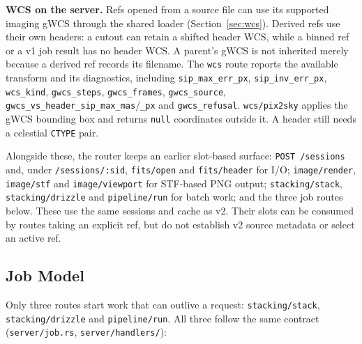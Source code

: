 \documentclass[11pt,a4paper]{article}
\newcommand{\code}[1]{\texttt{\small #1}}
\begin{document}
    \textbf{WCS on the server.} Refs opened from a source file can use its supported imaging gWCS through the shared loader (Section~\ref{sec:wcs}). Derived refs use their own headers: a cutout can retain a shifted header WCS, while a binned ref or a v1 job result has no header WCS. A parent's gWCS is not inherited merely because a derived ref records its filename. The \code{wcs} route reports the available transform and its diagnostics, including \code{sip\_max\_err\_px}, \code{sip\_inv\_err\_px}, \code{wcs\_kind}, \code{gwcs\_steps}, \code{gwcs\_frames}, \code{gwcs\_source}, \code{gwcs\_vs\_header\_sip\_max\_mas}/\code{\_px} and \code{gwcs\_refusal}. \code{wcs/pix2sky} applies the gWCS bounding box and returns \code{null} coordinates outside it. A header still needs a celestial \code{CTYPE} pair.

    Alongside these, the router keeps an earlier slot-based surface: \code{POST /sessions} and, under \code{/sessions/:sid}, \code{fits/open} and \code{fits/header} for I/O; \code{image/render}, \code{image/stf} and \code{image/viewport} for STF-based PNG output; \code{stacking/stack}, \code{stacking/drizzle} and \code{pipeline/run} for batch work; and the three job routes below. These use the same sessions and cache as v2. Their slots can be consumed by routes taking an explicit ref, but do not establish v2 source metadata or select an active ref.

    \subsection{Job Model}

    Only three routes start work that can outlive a request: \code{stacking/stack}, \code{stacking/drizzle} and \code{pipeline/run}. All three follow the same contract (\code{server/job.rs}, \code{server/handlers/}):
\end{document}
